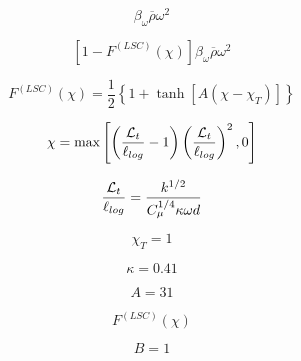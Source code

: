 

\begin{equation}
\beta_{\omega} \overline\rho \omega^{2}
\end{equation}

\begin{equation}
\left[ 1 - F^{(LSC)}(\chi) \right] \beta_{\omega} \overline\rho \omega^{2}
\end{equation}

\begin{equation}
F^{(LSC)}(\chi) = \frac{1}{2} \left\{ 1 + \tanh \left[ A \left( \chi - \chi_{T} \right) \right] \right\}
\end{equation}

\begin{equation}
\chi = \max \left[ \left( \frac{{\cal L}_{t}}{\ell_{log}} - 1 \right) \left( \frac{{\cal L}_{t}}{\ell_{log}} \right)^{2} , 0 \right]
\end{equation}

\begin{equation}
\frac{{\cal L}_{t}}{\ell_{log}} = \frac{k^{1/2}}{C_{\mu}^{1/4} \kappa \omega d}
\end{equation}

\begin{equation}
\chi_{T} = 1
\end{equation}

\begin{equation}
\kappa = 0.41
\end{equation}

\begin{equation}
A=31
\end{equation}

\begin{equation}
F^{(LSC)}(\chi)
\end{equation}

\begin{equation}
B=1
\end{equation}


